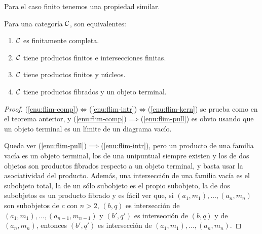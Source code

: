 Para el caso finito tenemos una propiedad similar.

\begin{theorem}
  Para una categoría $\mathcal{C}$, son equivalentes:
  \begin{enumerate}
  \item \label{enu:flim-comp} $\mathcal{C}$ es finitamente completa.
  \item \label{enu:flim-intr} $\mathcal{C}$ tiene productos finitos e intersecciones
    finitas.
  \item \label{enu:flim-kern} $\mathcal{C}$ tiene productos finitos y núcleos.
  \item \label{enu:flim-pull} $\mathcal{C}$ tiene productos fibrados y un objeto
    terminal.
  \end{enumerate}
\end{theorem}
\begin{proof}
  (\ref{enu:flim-comp})$\iff$(\ref{enu:flim-intr})$\iff$(\ref{enu:flim-kern}) se
  prueba como en el teorema anterior, y
  (\ref{enu:flim-comp})$\implies$(\ref{enu:flim-pull}) es obvio usando que un
  objeto terminal es un límite de un diagrama vacío.

  Queda ver (\ref{enu:flim-pull})$\implies$(\ref{enu:flim-intr}), pero un
  producto de una familia vacía es un objeto terminal, los de una unipuntual
  siempre existen y los de dos objetos son productos fibrados respecto a un
  objeto terminal, y basta usar la asociatividad del producto. Además, una
  intersección de una familia vacía es el subobjeto total, la de un sólo
  subobjeto es el propio subobjeto, la de dos subobjetos es un producto fibrado
  y es fácil ver que, si $(a_1,m_1),\dots,(a_n,m_n)$ son subobjetos de $c$ con
  $n>2$, $(b,q)$ es intersección de $(a_1,m_1),\dots,(a_{n-1},m_{n-1})$ y
  $(b',q')$ es intersección de $(b,q)$ y de $(a_n,m_n)$, entonces $(b',q')$ es
  intersección de $(a_1,m_1),\dots,(a_n,m_n)$.
\end{proof}

